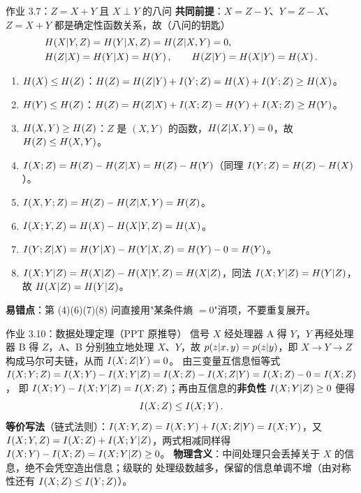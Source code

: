 \begin{example}{作业 3.7：$Z=X+Y$ 且 $X\perp Y$ 的八问}
\textbf{共同前提}：$X=Z-Y$、$Y=Z-X$、$Z=X+Y$ 都是确定性函数关系，故（八问的钥匙）
\begin{align*}
&\Hx{X|Y,Z}=\Hx{Y|X,Z}=\Hx{Z|X,Y}=0,\\
&\Hx{Z|X}=\Hx{Y|X}=\Hx{Y},\qquad \Hx{Z|Y}=\Hx{X|Y}=\Hx{X}.
\end{align*}
\begin{enumerate}[label=(\arabic*),leftmargin=1.8em,itemsep=0pt,topsep=1pt]
  \item $\Hx{X}\le\Hx{Z}$：$\Hx{Z}=\Hx{Z|Y}+\I{Y;Z}=\Hx{X}+\I{Y;Z}\ge\Hx{X}$。
  \item $\Hx{Y}\le\Hx{Z}$：$\Hx{Z}=\Hx{Z|X}+\I{X;Z}=\Hx{Y}+\I{X;Z}\ge\Hx{Y}$。
  \item $\Hx{X,Y}\ge\Hx{Z}$：$Z$ 是 $(X,Y)$ 的函数，$\Hx{Z|X,Y}=0$，故 $\Hx{Z}\le\Hx{X,Y}$。
  \item $\I{X;Z}=\Hx{Z}-\Hx{Z|X}=\Hx{Z}-\Hx{Y}$（同理 $\I{Y;Z}=\Hx{Z}-\Hx{X}$）。
  \item $\I{X,Y;Z}=\Hx{Z}-\Hx{Z|X,Y}=\Hx{Z}$。
  \item $\I{X;Y,Z}=\Hx{X}-\Hx{X|Y,Z}=\Hx{X}$。
  \item $\I{Y;Z|X}=\Hx{Y|X}-\Hx{Y|X,Z}=\Hx{Y}-0=\Hx{Y}$。
  \item $\I{X;Y|Z}=\Hx{X|Z}-\Hx{X|Y,Z}=\Hx{X|Z}$，同法 $\I{X;Y|Z}=\Hx{Y|Z}$，
        故 $\Hx{X|Z}=\Hx{Y|Z}$。
\end{enumerate}
\textbf{易错点}：第 (4)(6)(7)(8) 问直接用"某条件熵 $=0$"消项，不要重复展开。
\end{example}

\begin{example}{作业 3.10：数据处理定理（PPT 原推导）}
信号 $X$ 经处理器 A 得 $Y$，$Y$ 再经处理器 B 得 $Z$，A、B 分别独立地处理 $X$、$Y$，故
$\p{z|x,y}=\p{z|y}$，即 $X\to Y\to Z$ 构成马尔可夫链，从而 $\I{X;Z|Y}=0$。
由三变量互信息恒等式
$\I{X;Y;Z}=\I{X;Y}-\I{X;Y|Z}=\I{X;Z}-\I{X;Z|Y}=\I{X;Z}-0=\I{X;Z}$，
即 $\I{X;Y}-\I{X;Y|Z}=\I{X;Z}$；再由互信息的\textbf{非负性} $\I{X;Y|Z}\ge0$ 便得
\[
\I{X;Z}\le\I{X;Y}.
\]
\textbf{等价写法}（链式法则）：$\I{X;Y,Z}=\I{X;Y}+\I{X;Z|Y}=\I{X;Y}$，又
$\I{X;Y,Z}=\I{X;Z}+\I{X;Y|Z}$，两式相减同样得 $\I{X;Y}-\I{X;Z}=\I{X;Y|Z}\ge0$。
\textbf{物理含义}：中间处理只会丢掉关于 $X$ 的信息，绝不会凭空造出信息；级联的
处理级数越多，保留的信息单调不增（由对称性还有 $\I{X;Z}\le\I{Y;Z}$）。
\end{example}
